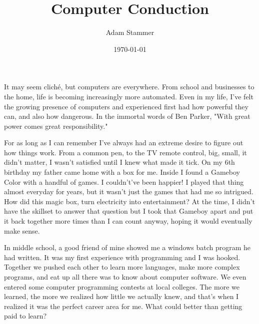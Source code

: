 \documentclass[prb,preprint]{revtex4-1}
\begin{document}
\title{Computer Conduction}
\author{Adam Stammer}

\date{\today}
\maketitle



It may seem cliché, but computers are everywhere. From school and businesses to the home, life is becoming increasingly more automated. Even in my life, I've felt the growing presence of computers and experienced first had how powerful they can, and also how dangerous. In the immortal words of Ben Parker, "With great power comes great responsibility." 

For as long as I can remember I've always had an extreme desire to figure out how things work. From a common pen, to the TV remote control, big, small, it didn't matter, I wasn't satisfied until I knew what made it tick. On my 6th birthday my father came home with a box for me. Inside I found a Gameboy Color with a handful of games. I couldn't've been happier! I played that thing almost everyday for years, but it wasn't just the games that had me so intrigued. How did this magic box, turn electricity into entertainment? At the time, I didn't have the skillset to answer that question but I took that Gameboy apart and put it back together more times than I can count anyway, hoping it would eventually make sense. 

In middle school, a good friend of mine showed me a windows batch program he had written. It was my first experience with programming and I was hooked. Together we pushed each other to learn more languages, make more complex programs, and eat up all there was to know about computer software. We even entered some computer programming contests at local colleges. The more we learned, the more we realized how little we actually knew, and that's when I realized it was the perfect career area for me. What could better than getting paid to learn?



\end{document}
